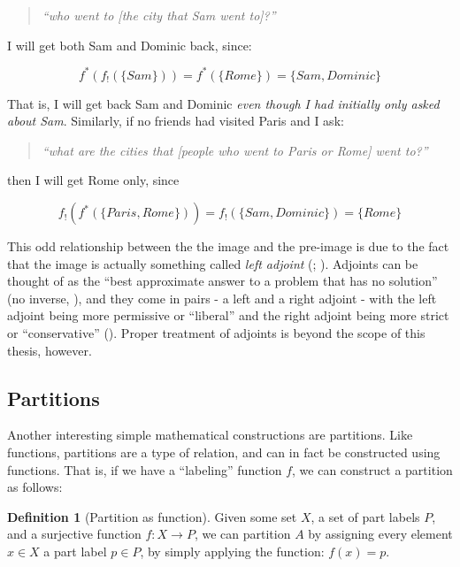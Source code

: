 \documentclass[
]{book}
\theoremstyle{definition}
\newtheorem{definition}{Definition}[chapter]
\theoremstyle{definition}
\theoremstyle{definition}
\theoremstyle{definition}
\theoremstyle{remark}
\begin{document}
\begin{quote}
\emph{``who went to {[}the city that Sam went to{]}?''}
\end{quote}

I will get both Sam and Dominic back, since:

\[f^*(f_!(\{ Sam \})) = f^*(\{ Rome \}) = \{ Sam, Dominic \}\]

That is, I will get back Sam and Dominic \emph{even though I had initially only asked about Sam}. Similarly, if no friends had visited Paris and I ask:

\begin{quote}
\emph{``what are the cities that {[}people who went to Paris or Rome{]} went to?''}
\end{quote}

then I will get Rome only, since

\[f_!(f^*(\{Paris, Rome \})) = f_!(\{ Sam, Dominic \}) = \{ Rome \}\]

This odd relationship between the the image and the pre-image is due to the fact that the image is actually something called \emph{left adjoint} (; ). Adjoints can be thought of as the ``best approximate answer to a problem that has no solution'' (no inverse, ), and they come in pairs - a left and a right adjoint - with the left adjoint being more permissive or ``liberal'' and the right adjoint being more strict or ``conservative'' (). Proper treatment of adjoints is beyond the scope of this thesis, however.

\subsection{Partitions}\label{partitions}

Another interesting simple mathematical constructions are partitions. Like functions, partitions are a type of relation, and can in fact be constructed using functions. That is, if we have a ``labeling'' function \(f\), we can construct a partition as follows:

\begin{definition}[Partition as function]
Given some set \(X\), a set of part labels \(P\), and a surjective function \(f: X \to P\), we can partition \(A\) by assigning every element \(x \in X\) a part label \(p \in P\), by simply applying the function: \(f(x) = p\).
\end{definition}
\end{document}
